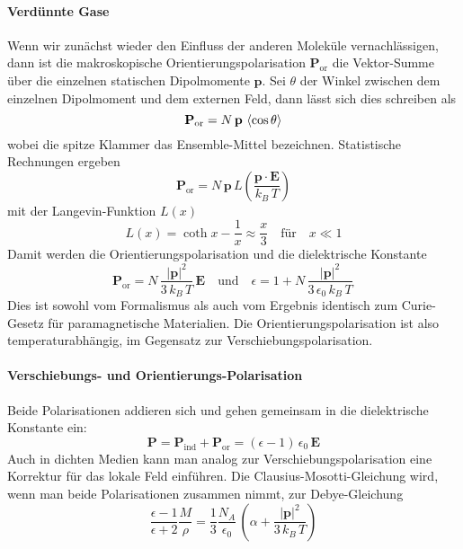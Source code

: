 \paragraph{Verdünnte Gase} Wenn wir zunächst wieder den Einfluss der anderen Moleküle vernachlässigen, dann ist die makroskopische Orientierungspolarisation $\mathbf{P}_\text{or}$ die Vektor-Summe über die einzelnen statischen Dipolmomente $ \mathbf{p}$. Sei $\theta$ der Winkel zwischen dem einzelnen Dipolmoment und dem externen Feld, dann lässt sich dies schreiben als
\begin{equation}
\mathbf{P}_\text{or} = N \, \mathbf{p} \, \braket{ \cos \theta}
\end{equation}
wobei die spitze Klammer das Ensemble-Mittel bezeichnen. Statistische Rechnungen ergeben
 \begin{equation}
\mathbf{P}_\text{or} = N \, \mathbf{p} \, L \left( \frac{\mathbf{p} \cdot \mathbf{E}}{k_B \, T} \right)
\end{equation}
mit der Langevin-Funktion $L(x)$
\begin{equation}
L(x) = \coth x - \frac{1}{x} \approx \frac{x}{3} \quad \text{für} \quad x \ll 1
\end{equation}
Damit werden die Orientierungspolarisation und die dielektrische Konstante
\begin{equation}
\mathbf{P}_\text{or} = N \, \frac{|\mathbf{p} |^2}{3 \, k_B \, T} \, \mathbf{E}  \quad \text{und} \quad \epsilon = 1 + N \, \frac{|\mathbf{p} |^2}{3\, \epsilon_0 \, k_B \, T} \,
\end{equation}
Dies ist sowohl vom Formalismus als auch vom Ergebnis identisch zum Curie-Gesetz für paramagnetische Materialien. Die Orientierungspolarisation ist also temperaturabhängig, im Gegensatz zur Verschiebungspolarisation.

\paragraph{Verschiebungs- und Orientierungs-Polarisation} Beide Polarisationen addieren sich und gehen gemeinsam in die dielektrische Konstante ein:
\begin{equation}
\mathbf{P}  = \mathbf{P}_\text{ind} + \mathbf{P}_\text{or} = \left( \epsilon - 1 \right) \, \epsilon_0 \, \mathbf{E}
\end{equation}
Auch in dichten Medien kann man analog zur Verschiebungspolarisation eine Korrektur für das lokale Feld einführen. Die Clausius-Mosotti-Gleichung wird, wenn man beide Polarisationen zusammen nimmt, zur Debye-Gleichung
 \begin{equation}
 \frac{\epsilon - 1}{\epsilon + 2} \frac{M}{\rho} = \frac{1}{3} \frac{N_A}{\epsilon
_0} \,  \left( \alpha  + \frac{|\mathbf{p} |^2}{3 \, k_B \, T}  \right)
 \end{equation}
 
